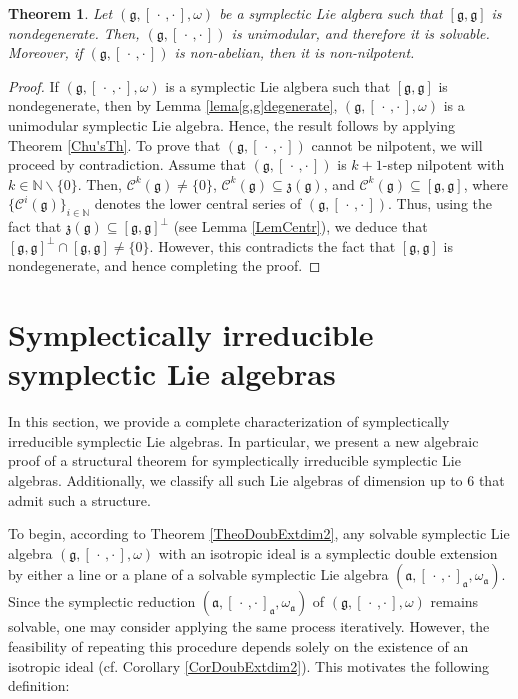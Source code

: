 \documentclass[final,1p,times,nopreprintline]{elsarticle}
\newtheorem{theorem}{Theorem}[section]
\theoremstyle{definition}
\numberwithin{equation}{section}
\newcommand{\w}{\omega}
\newcommand{\g}{\mathfrak{g}}
\newcommand{\ai}{\mathfrak{a}}
\numberwithin{equation}{section}
\newcommand{\z}{\mathfrak{z}}
\newcommand{\cro}{[\,\cdot\,,\cdot\,]}
\begin{document}
\begin{theorem}\label{MainResNot}
	Let $(\g,[\,\cdot\,,\cdot\,],\w)$ be a symplectic Lie algbera such that $[\g,\g]$ is nondegenerate. Then, $(\g,[\,\cdot\,,\cdot\,])$ is unimodular, and therefore it is solvable. Moreover, if $(\g,[\,\cdot\,,\cdot\,])$ is non-abelian, then it is non-nilpotent.
\end{theorem}

\begin{proof}
	If $(\g,[\,\cdot\,,\cdot\,],\w)$ is a symplectic Lie algbera such that $[\g,\g]$ is nondegenerate, then by  Lemma \ref{lema[g,g]degenerate}, $(\g,[\,\cdot\,,\cdot\,],\w)$ is a unimodular symplectic Lie algebra. Hence, the result follows by applying Theorem \ref{Chu'sTh}. To prove that $(\g,\cro)$ cannot be nilpotent, we will proceed by contradiction. Assume that $(\g,\cro)$ is $k+1$-step nilpotent with $k\in\mathbb{N}\backslash\{0\}$. Then, $\mathcal{C}^k(\g)\neq \{0\}$, $\mathcal{C}^k(\g)\subseteq\z(\g)$, and $\mathcal{C}^k(\g)\subseteq [\g,\g]$, where $\{\mathcal{C}^i(\g)\}_{i\in\mathbb{N}}$ denotes the lower central series of $(\g,\cro)$. Thus, using the fact that $\z(\g)\subseteq [\g,\g]^\perp$ (see Lemma \ref{LemCentr}), we deduce that $[\g,\g]^\perp\cap [\g,\g]\neq\{0\}$. However, this contradicts the fact that $[\g,\g]$ is nondegenerate, and hence completing the proof.
\end{proof}

\section{Symplectically irreducible symplectic Lie algebras}\label{Art4SectionIrreducible}

In this section, we provide a complete characterization of symplectically irreducible symplectic Lie algebras. In particular, we present a new algebraic proof of a structural theorem for symplectically irreducible symplectic Lie algebras. Additionally, we classify all such Lie algebras of dimension up to $6$ that admit such a structure.

To begin, according to Theorem \ref{TheoDoubExtdim2}, any solvable symplectic Lie algebra $(\g,\cro,\w)$ with an isotropic ideal is a symplectic double extension by either a line or a plane of a solvable symplectic Lie algebra $(\ai,\cro_\ai,\w_\ai)$. Since the symplectic reduction $(\ai,\cro_\ai,\w_\ai)$ of $(\g,\cro,\w)$ remains solvable, one may consider applying the same process iteratively. However, the feasibility of repeating this procedure depends solely on the existence of an isotropic ideal (cf. Corollary \ref{CorDoubExtdim2}). This motivates the following definition:
\end{document}
